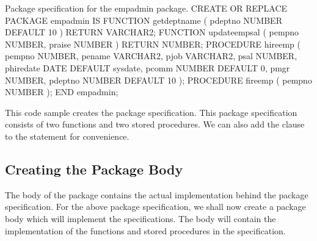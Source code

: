 \documentclass[letterpaper,10pt,english,openany,oneside]{sphinxmanual}
\begin{document}
%
\begin{sphinxVerbatim}[commandchars=\\\{\}]
\PYGZhy{}\PYGZhy{}
\PYGZhy{}\PYGZhy{} Package specification for the \PYGZsq{}emp\PYGZus{}admin\PYGZsq{} package.
\PYGZhy{}\PYGZhy{}
CREATE OR REPLACE PACKAGE emp\PYGZus{}admin
IS
   FUNCTION get\PYGZus{}dept\PYGZus{}name (
     p\PYGZus{}deptno NUMBER DEFAULT 10
)
   RETURN VARCHAR2;
   FUNCTION update\PYGZus{}emp\PYGZus{}sal (
     p\PYGZus{}empno NUMBER,
     p\PYGZus{}raise NUMBER
)
   RETURN NUMBER;
   PROCEDURE hire\PYGZus{}emp (
     p\PYGZus{}empno           NUMBER,
     p\PYGZus{}ename           VARCHAR2,
     p\PYGZus{}job             VARCHAR2,
     p\PYGZus{}sal             NUMBER,
     p\PYGZus{}hiredate        DATE      DEFAULT   sysdate,
     p\PYGZus{}comm            NUMBER    DEFAULT   0,
     p\PYGZus{}mgr             NUMBER,
     p\PYGZus{}deptno          NUMBER    DEFAULT   10
    );
   PROCEDURE fire\PYGZus{}emp (
     p\PYGZus{}empno NUMBER
);
END emp\PYGZus{}admin;
\end{sphinxVerbatim}

This code sample creates the  package specification. This
package specification consists of two functions and two stored
procedures. We can also add the  clause to the 
statement for convenience.

\newpage


\subsection{Creating the Package Body}
\label{\detokenize{creating_packages:creating-the-package-body}}
The body of the package contains the actual implementation behind the
package specification. For the above  package specification,
we shall now create a package body which will implement the
specifications. The body will contain the implementation of the
functions and stored procedures in the specification.
\end{document}
